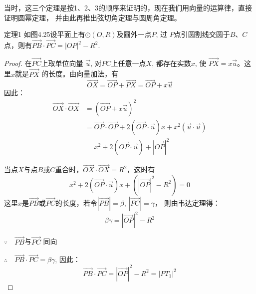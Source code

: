 当时，这三个定理是按1、2、3的顺序来证明的，现在我们用向量的运算律，直接证明圆幂定理，
并由此再推出弦切角定理与圆周角定理。

\begin{blk}{定理1}
    如图4.25设平面上有$\odot (O,R)$及圆外一点$P$, 过
$P$点引圆割线交圆于$B$、$C$点，则有$\Vec{PB}\cdot \Vec{PC}=|OP|^2-R^2$.
\end{blk}

\begin{figure}[htp]
    \centering
{}   
    \caption{}
\end{figure}


\begin{proof}
    在$\Vec{PC}$上取单位向量
$\vec{u}$, 对$PC$上任意一点$X$, 都存在实数$x$, 使
$\Vec{PX}=x\vec{u}$。这里$x$就是$\Vec{PX}$
的长度。由向量加法，有
\[\Vec{OX}=\Vec{OP}+\Vec{PX}=\Vec{OP}+x\vec{u}\]
因此：
\[\begin{split}
    \Vec{OX}\cdot \Vec{OX}&=\left(\Vec{OP}+x\vec{u}\right)^2\\
    &=\Vec{OP}\cdot \Vec{OP}+2\left(\Vec{OP}\cdot \vec{u}\right)x+x^2(\vec{u}\cdot \vec{u})\\
    &=x^2+2\left(\Vec{OP}\cdot \vec{u}\right)+|\Vec{OP}|^2
\end{split}\]

当点$X$与点$B$或$C$重合时，$\Vec{OX}\cdot \Vec{OX}=R^2$，这时有
\[x^2+2\left(\Vec{OP}\cdot \vec{u}\right)x+\left(|\Vec{OP}|^2-R^2\right)=0\]
这里$x$是$\Vec{PB}$或$\Vec{PC}$的长度，若令$|\Vec{PB}|=\beta$,
 $|\Vec{PC}|=\gamma$，
则由韦达定理得：
\[\beta\gamma=|\Vec{OP}|^2-R^2\]

$\because\quad \Vec{PB}$与$\Vec{PC}$
同向

$\therefore\quad \Vec{PB}\cdot \Vec{PC}=\beta\gamma$, 因此：
\[\Vec{PB}\cdot \Vec{PC}=|\Vec{OP}|^2-R^2=|PT_1|^2\]
\end{proof}

